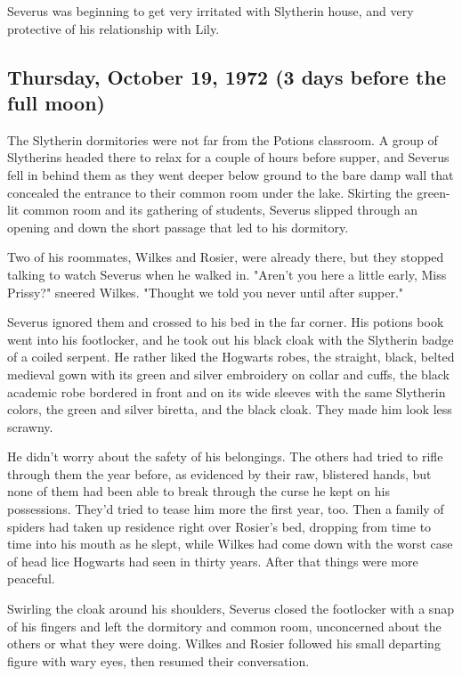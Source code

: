 Severus was beginning to get very irritated with Slytherin house, and very protective of his relationship with Lily.

\subsection{Thursday, October 19, 1972 (3 days before the full moon)}

The Slytherin dormitories were not far from the Potions classroom. A group of Slytherins headed there to relax for a couple of hours before supper, and Severus fell in behind them as they went deeper below ground to the bare damp wall that concealed the entrance to their common room under the lake. Skirting the green-lit common room and its gathering of students, Severus slipped through an opening and down the short passage that led to his dormitory.

Two of his roommates, Wilkes and Rosier, were already there, but they stopped talking to watch Severus when he walked in. "Aren't you here a little early, Miss Prissy?" sneered Wilkes. "Thought we told you never until after supper."

Severus ignored them and crossed to his bed in the far corner. His potions book went into his footlocker, and he took out his black cloak with the Slytherin badge of a coiled serpent. He rather liked the Hogwarts robes, the straight, black, belted medieval gown with its green and silver embroidery on collar and cuffs, the black academic robe bordered in front and on its wide sleeves with the same Slytherin colors, the green and silver biretta, and the black cloak. They made him look less scrawny.

He didn't worry about the safety of his belongings. The others had tried to rifle through them the year before, as evidenced by their raw, blistered hands, but none of them had been able to break through the curse he kept on his possessions. They'd tried to tease him more the first year, too. Then a family of spiders had taken up residence right over Rosier's bed, dropping from time to time into his mouth as he slept, while Wilkes had come down with the worst case of head lice Hogwarts had seen in thirty years. After that things were more peaceful.

Swirling the cloak around his shoulders, Severus closed the footlocker with a snap of his fingers and left the dormitory and common room, unconcerned about the others or what they were doing. Wilkes and Rosier followed his small departing figure with wary eyes, then resumed their conversation.

